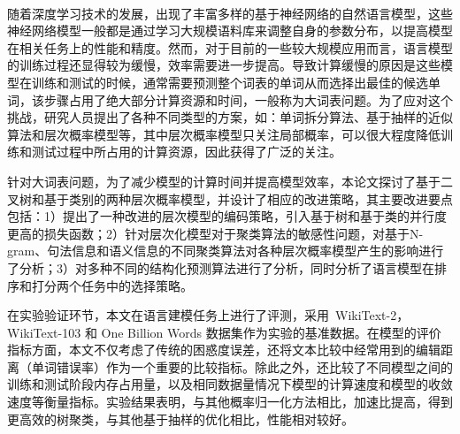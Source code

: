 \documentclass[master,openright,oneside,color]{buaathesis}
\begin{document}


\maketitle
\pagestyle{frontmatter}
\begin{cabstract}
~\

随着深度学习技术的发展，出现了丰富多样的基于神经网络的自然语言模型，这些神经网络模型一般都是通过学习大规模语料库来调整自身的参数分布，以提高模型在相关任务上的性能和精度。然而，对于目前的一些较大规模应用而言，语言模型的训练过程还显得较为缓慢，效率需要进一步提高。导致计算缓慢的原因是这些模型在训练和测试的时候，通常需要预测整个词表的单词从而选择出最佳的候选单词，该步骤占用了绝大部分计算资源和时间，一般称为大词表问题。为了应对这个挑战，研究人员提出了各种不同类型的方案，如：单词拆分算法、基于抽样的近似算法和层次概率模型等，其中层次概率模型只关注局部概率，可以很大程度降低训练和测试过程中所占用的计算资源，因此获得了广泛的关注。

针对大词表问题，为了减少模型的计算时间并提高模型效率，本论文探讨了基于二叉树和基于类别的两种层次概率模型，并设计了相应的改进策略，其主要改进要点包括：1）提出了一种改进的层次模型的编码策略，引入基于树和基于类的并行度更高的损失函数；2）针对层次化模型对于聚类算法的敏感性问题，对基于N-gram、句法信息和语义信息的不同聚类算法对各种层次概率模型产生的影响进行了分析；3）对多种不同的结构化预测算法进行了分析，同时分析了语言模型在排序和打分两个任务中的选择策略。

在实验验证环节，本文在语言建模任务上进行了评测，采用~WikiText-2， WikiText-103 和 One Billion Words 数据集作为实验的基准数据。在模型的评价指标方面，本文不仅考虑了传统的困惑度误差，还将文本比较中经常用到的编辑距离（单词错误率）作为一个重要的比较指标。除此之外，还比较了不同模型之间的训练和测试阶段内存占用量，以及相同数据量情况下模型的计算速度和模型的收敛速度等衡量指标。实验结果表明，与其他概率归一化方法相比，加速比提高，得到更高效的树聚类，与其他基于抽样的优化相比，性能相对较好。

\end{cabstract}
\end{document}
